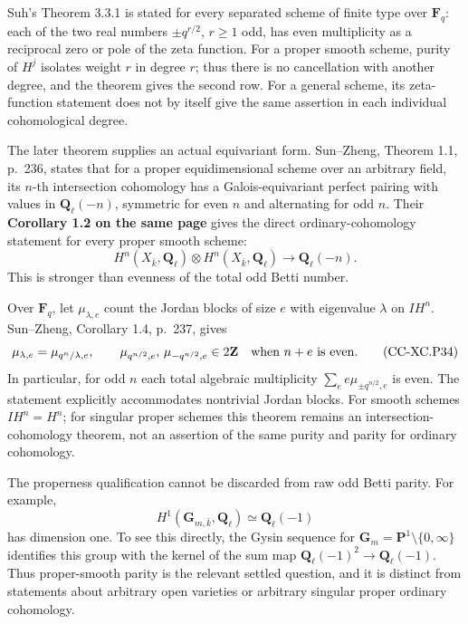 Suh's Theorem 3.3.1 is stated for every separated scheme of finite type
over \(\mathbf F_q\): each of the two real numbers \(\pm q^{r/2}\),
\(r\ge1\) odd, has even multiplicity as a reciprocal zero or pole of the
zeta function. For a proper smooth scheme, purity of \(H^j\) isolates
weight \(r\) in degree \(r\); thus there is no cancellation with another
degree, and the theorem gives the second row. For a general scheme, its
zeta-function statement does not by itself give the same assertion in
each individual cohomological degree.

The later theorem supplies an actual equivariant form. Sun--Zheng,
Theorem 1.1, p.~236, states that for a proper equidimensional scheme
over an arbitrary field, its \(n\)-th intersection cohomology has a
Galois-equivariant perfect pairing with values in
\(\mathbf Q_\ell(-n)\), symmetric for even \(n\) and alternating for odd
\(n\). Their \textbf{Corollary 1.2 on the same page} gives the direct
ordinary-cohomology statement for every proper smooth scheme: \[
 H^n(X_{\bar k},\mathbf Q_\ell)\otimes
 H^n(X_{\bar k},\mathbf Q_\ell)
       \longrightarrow\mathbf Q_\ell(-n).
                                                        \tag{CC-XC.P33}
\] This is stronger than evenness of the total odd Betti number.

Over \(\mathbf F_q\), let \(\mu_{\lambda,e}\) count the Jordan blocks of
size \(e\) with eigenvalue \(\lambda\) on \(IH^n\). Sun--Zheng,
Corollary 1.4, p.~237, gives \[
 \mu_{\lambda,e}=\mu_{q^n/\lambda,e},\qquad
 \mu_{q^{n/2},e},\,\mu_{-q^{n/2},e}\in2\mathbf Z
                   \quad\hbox{when }n+e\text{ is even}.
                                                        \tag{CC-XC.P34}
\] In particular, for odd \(n\) each total algebraic multiplicity
\(\sum_e e\mu_{\pm q^{n/2},e}\) is even. The statement explicitly
accommodates nontrivial Jordan blocks. For smooth schemes \(IH^n=H^n\);
for singular proper schemes this theorem remains an intersection-
cohomology theorem, not an assertion of the same purity and parity for
ordinary cohomology.

The properness qualification cannot be discarded from raw odd Betti
parity. For example, \[
 H^1(\mathbf G_{m,\bar k},\mathbf Q_\ell)
      \simeq\mathbf Q_\ell(-1)
                                                        \tag{CC-XC.P35}
\] has dimension one. To see this directly, the Gysin sequence for
\(\mathbf G_m=\mathbf P^1\setminus\{0,\infty\}\) identifies this group
with the kernel of the sum map
\(\mathbf Q_\ell(-1)^2\to\mathbf Q_\ell(-1)\). Thus proper-smooth parity
is the relevant settled question, and it is distinct from statements
about arbitrary open varieties or arbitrary singular proper ordinary
cohomology.

